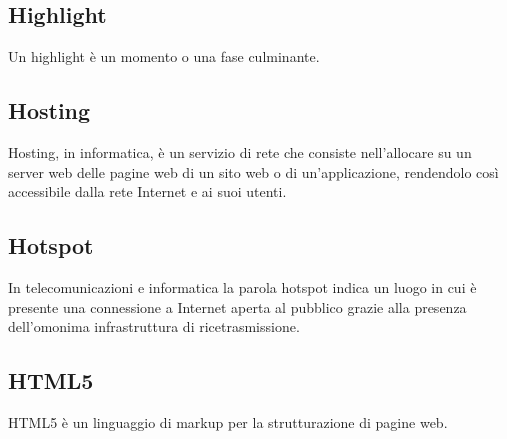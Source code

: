 
\subsection*{Highlight}
Un highlight è un momento o una fase culminante.

\subsection*{Hosting}
Hosting, in informatica, è un servizio di rete che consiste nell'allocare su un server web delle pagine web di un sito web o di un'applicazione, rendendolo così accessibile dalla rete Internet e ai suoi utenti.

\subsection*{Hotspot}
In telecomunicazioni e informatica la parola hotspot indica un luogo in cui è presente una connessione a Internet aperta al pubblico grazie alla presenza dell'omonima infrastruttura di ricetrasmissione.

\subsection*{HTML5}
HTML5 è un linguaggio di markup per la strutturazione di pagine web.


